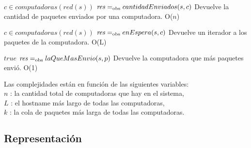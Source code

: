  {$c \in computadoras(red(s))$}
 {$\text{\textit{res}} =_{\mathrm{obs}} cantidadEnviados(s,c)$}
 {Devuelve la cantidad de paquetes enviados por una computadora.}
 {O($n$)} %

 {$c \in computadoras(red(s))$}
 {$\text{\textit{res}} =_{\mathrm{obs}} enEspera(s,c)$}
 {Devuelve un iterador a los paquetes de la computadora.}
 {O(L)}

 {$true$}
 {$\text{\textit{res}} =_{\mathrm{obs}} laQueMasEnvio(s,p)$}
 {Devuelve la computadora que más paquetes envió.}
 {O(1)}

Las complejidades están en función de las siguientes variables:\\
$n$ : la cantidad total de computadoras que hay en el sistema, \\
$L$ : el hostname más largo de todas las computadoras, \\
$k$ : la cola de paquetes más larga de todas las computadoras. 

\subsection{Representación}





